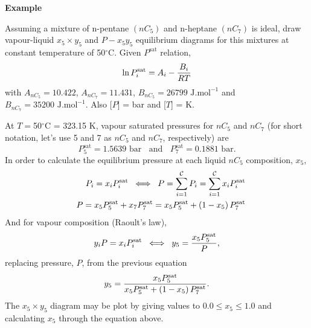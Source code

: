   \medskip
   \begin{MyExample}{\begin{center}{\bf Example}\end{center}}
     \begin{example}\label{Chapter:VLE:Example1}
       Assuming a mixture of n-pentane $\left(nC_{5}\right)$ and n-heptane $\left(nC_{7}\right)$ is ideal, draw vapour-liquid $x_{5}\times y_{5}$ and $P-x_{5}y_{5}$ equilibrium diagrams for this mixtures at constant temperature of 50$^{\circ}$C. Given $P^{\text{sat}}$ relation,
       \begin{displaymath}
         \ln{P_{i}^{\text{sat}}} = A_{i} - \frc{B_{i}}{RT}
       \end{displaymath}
       with $A_{nC_{5}}=10.422$, $A_{nC_{7}}=11.431$, $B_{nC_{5}}=26799 \text{ J.mol}^{-1}$ and $B_{nC_{7}}=35200 \text{ J.mol}^{-1}$. Also [$P$] = bar and [$T$] = K.
     \end{example}

        At $T=$50$^{\circ}$C = 323.15 K, vapour saturated pressures for $nC_{5}$ and $nC_{7}$ (for short notation, let's use 5 and 7 as $nC_{5}$ and $nC_{7}$, respectively) are
           \begin{displaymath}
              P_{5}^{\text{sat}} = 1.5639\text{ bar}\;\;\text{ and }\;\;P_{7}^{\text{sat}} = 0.1881\text{ bar}.
           \end{displaymath}
           In order to calculate the equilibrium pressure at each liquid $nC_{5}$ composition, $x_{5}$,
           \begin{eqnarray}
               && P_{i} = x_{i}P_{i}^{\text{sat}} \;\;\Longleftrightarrow \;\; P = \summation[P_{i}]{i=1}{\mathcal{C}} = \summation[x_{i}P_{i}^{\text{sat}}]{i=1}{\mathcal{C}} \nonumber \\
               && P = x_{5}P_{5}^{\text{sat}} + x_{7}P_{7}^{\text{sat}} = x_{5}P_{5}^{\text{sat}} + \left(1-x_{5}\right)P_{7}^{\text{sat}} \nonumber 
           \end{eqnarray}
           And for vapour composition (Raoult's law),
           \begin{displaymath}
               y_{i} P = x_{i}P_{i}^{\text{sat}}  \;\;\Longleftrightarrow \;\; y_{5} = \frc{x_{5}P_{5}^{\text{sat}}}{P},
           \end{displaymath}
           replacing pressure, $P$, from the previous equation
           \begin{displaymath}
               y_{5} = \frc{x_{5}P_{5}^{\text{sat}}}{x_{5}P_{5}^{\text{sat}} + \left(1-x_{5}\right)P_{7}^{\text{sat}}}.
           \end{displaymath}
           The $x_{5} \times y_{5}$ diagram may be plot by giving values to $0.0\leq x_{5} \leq 1.0$ and calculating $x_{5}$ through the equation above.


\end{MyExample}
